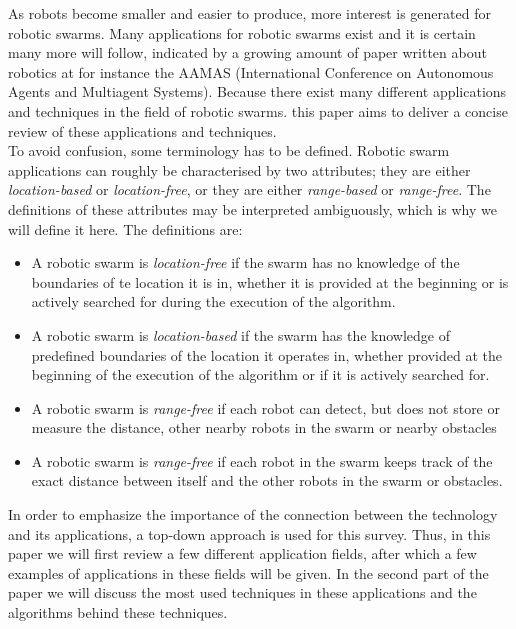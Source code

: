  As robots become smaller and easier to produce, more interest is generated for robotic swarms. Many applications for robotic swarms exist and it is certain many more will follow, indicated by a growing amount of paper written about robotics at for instance the AAMAS (International Conference on Autonomous Agents and Multiagent Systems). \cite{Amigoni2014} Because there exist many different applications and techniques in the field of robotic swarms. this paper aims to deliver a concise review of these applications and techniques. \\
To avoid confusion, some terminology has to be defined. Robotic swarm applications can roughly be characterised by two attributes; they are either \emph{location-based} or \emph{location-free}, or they are either \emph{range-based} or \emph{range-free}. The definitions of these attributes may be interpreted ambiguously, which is why we will define it here. The definitions are:

  \begin{itemize}
    \item A robotic swarm is \emph{location-free} if the swarm has no knowledge  of the boundaries of te location it is in, whether it is provided at the beginning or is actively searched for during the execution of the algorithm. 
    \item A robotic swarm is \emph{location-based} if the swarm has the knowledge of predefined boundaries of the location it operates in, whether provided at the beginning of the execution of the algorithm or if it is actively searched for. 
    \item A robotic swarm is \emph{range-free} if each robot can detect, but does not store or measure the distance, other nearby robots in the swarm or nearby obstacles
    \item  A robotic swarm is \emph{range-free} if each robot in the swarm keeps track of the exact distance between itself and the other robots in the swarm or obstacles. 
  \end{itemize}

In order to emphasize the importance of the connection between the technology and its applications, a top-down approach is used for this survey. Thus,  in this paper we will first review a few different application fields, after which a few examples of applications in these fields will be given. In the second part of the paper we will discuss the most used techniques in these applications and the algorithms behind these techniques. \\
